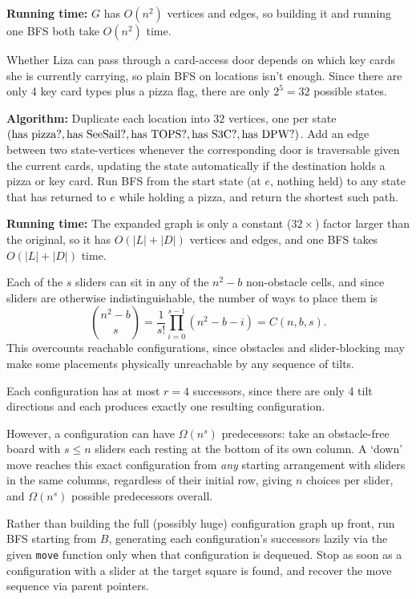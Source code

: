 \documentclass[12pt,twoside]{article}
\begin{document}
\begin{problems}
\textbf{Running time:} $G$ has $O(n^2)$ vertices and edges, so building it and running one BFS both take $O(n^2)$ time.

\newpage
\problem  %

Whether Liza can pass through a card-access door depends on which key cards she is currently carrying, so plain BFS on locations isn't enough. Since there are only 4 key card types plus a pizza flag, there are only $2^5 = 32$ possible states.

\textbf{Algorithm:} Duplicate each location into $32$ vertices, one per state $(\text{has pizza?}, \text{has SeeSail?}, \text{has TOPS?},\\ \text{has S3C?}, \text{has DPW?})$. Add an edge between two state-vertices whenever the corresponding door is traversable given the current cards, updating the state automatically if the destination holds a pizza or key card. Run BFS from the start state (at $e$, nothing held) to any state that has returned to $e$ while holding a pizza, and return the shortest such path.

\textbf{Running time:} The expanded graph is only a constant ($32\times$) factor larger than the original, so it has $O(|L|+|D|)$ vertices and edges, and one BFS takes $O(|L|+|D|)$ time.

\problem  %

\begin{problemparts}
\problempart %
Each of the $s$ sliders can sit in any of the $n^2-b$ non-obstacle cells, and since sliders are otherwise indistinguishable, the number of ways to place them is
\[
\binom{n^2-b}{s} = \frac{1}{s!}\prod_{i=0}^{s-1}(n^2-b-i) = C(n,b,s).
\]
This overcounts reachable configurations, since obstacles and slider-blocking may make some placements physically unreachable by any sequence of tilts.

\problempart %
Each configuration has at most $r = 4$ successors, since there are only 4 tilt directions and each produces exactly one resulting configuration.

However, a configuration can have $\Omega(n^s)$ predecessors: take an obstacle-free board with $s \le n$ sliders each resting at the bottom of its own column. A `down' move reaches this exact configuration from \emph{any} starting arrangement with sliders in the same columns, regardless of their initial row, giving $n$ choices per slider, and $\Omega(n^s)$ possible predecessors overall.

\problempart %
Rather than building the full (possibly huge) configuration graph up front, run BFS starting from $B$, generating each configuration's successors lazily via the given \texttt{move} function only when that configuration is dequeued. Stop as soon as a configuration with a slider at the target square is found, and recover the move sequence via parent pointers.


\end{problemparts}
\end{problems}
\end{document}
